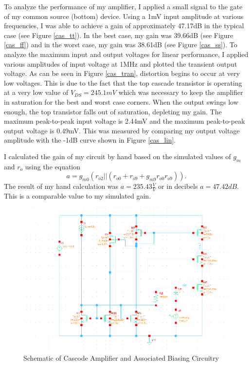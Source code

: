 \documentclass{article}
\begin{document}
To analyze the performance of my  amplifier, I applied a small signal to the gate of my common source (bottom) device. Using a 1mV input amplitude at various frequencies, I was able to achieve a gain of approximately 47.17dB in the typical case (see Figure \ref{cas_tt}). In the best case, my gain was 39.66dB (see Figure \ref{cas_ff}) and in the worst case, my gain was 38.61dB (see Figure \ref{cas_ss}). To analyze the maximum input and output voltages for linear performance, I applied various amplitudes of input voltage at 1MHz and plotted the transient output voltage. As can be seen in Figure \ref{cas_tran}, distortion begins to occur at very low voltages. This is due to the fact that the top cascade transistor is operating at a very low value of $V_{DS} = 245.1mV$ which was necessary to keep the amplifier in saturation for the best and worst case corners. When the output swings low enough, the top transistor falls out of saturation, depleting my gain. The maximum peak-to-peak input voltage is 2.44mV and the maximum peak-to-peak output voltage is 0.49mV. This was measured by comparing my output voltage amplitude with the -1dB curve shown in Figure \ref{cas_lin}.

I calculated the gain of my circuit by hand based on the simulated values of $g_m$ and $r_o$ using the equation
\begin{equation}
a = g_{m0}(r_{o2} || (r_{o0}+r_{o9}+g_{m9}r_{o0}r_{o9})).
\end{equation}
The result of my hand calculation was $a = 235.43\frac{V}{V}$ or in decibels $a = 47.42dB$. This is a comparable value to my simulated gain.


\begin{figure}[H]
\centering
\includegraphics[width=6in]{2_cas_schematic.png}
\caption{Schematic of Cascode Amplifier and Associated Biasing Circuitry}
\label{cas_schem}
\end{figure}
\end{document}
